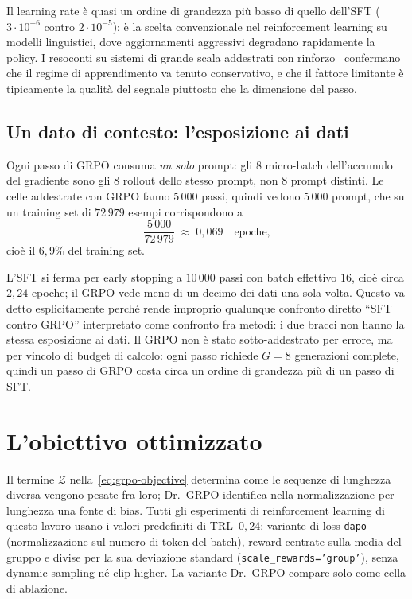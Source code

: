 Il learning rate è quasi un ordine di grandezza più basso di quello dell'SFT
($3\cdot 10^{-6}$ contro $2\cdot 10^{-5}$): è la scelta convenzionale nel
reinforcement learning su modelli linguistici, dove aggiornamenti aggressivi
degradano rapidamente la policy. I resoconti su sistemi di grande scala
addestrati con rinforzo~\cite{kimi2025k15} confermano che il regime di
apprendimento va tenuto conservativo, e che il fattore limitante è tipicamente
la qualità del segnale piuttosto che la dimensione del passo.

\subsection{Un dato di contesto: l'esposizione ai dati}

Ogni passo di GRPO consuma \emph{un solo} prompt: gli $8$ micro-batch
dell'accumulo del gradiente sono gli $8$ rollout dello stesso prompt, non $8$
prompt distinti. Le celle addestrate con GRPO fanno $5\,000$ passi, quindi vedono
$5\,000$ prompt, che su un training set di $72\,979$ esempi corrispondono a
\begin{equation}
  \frac{5\,000}{72\,979} \;\approx\; 0{,}069
  \quad\text{epoche,}
\end{equation}
cioè il $6{,}9\%$ del training set.

L'SFT si ferma per early stopping a $10\,000$ passi con batch effettivo $16$,
cioè circa $2{,}24$ epoche; il GRPO vede meno di un decimo dei dati una sola
volta. Questo va detto
esplicitamente perché rende improprio qualunque confronto diretto ``SFT contro
GRPO'' interpretato come confronto fra metodi: i due bracci non hanno la stessa
esposizione ai dati. Il GRPO non è stato sotto-addestrato per errore, ma per
vincolo di budget di calcolo: ogni passo richiede $G=8$ generazioni complete,
quindi un passo di GRPO costa circa un ordine di grandezza più di un passo di
SFT.

\section{L'obiettivo ottimizzato}
\label{sec:denominatori}

Il termine $\mathcal{Z}$ nella~\eqref{eq:grpo-objective} determina come le
sequenze di lunghezza diversa vengono pesate fra loro; Dr.~GRPO
\cite{liu2025drgrpo} identifica nella normalizzazione per lunghezza una fonte di
bias. Tutti gli esperimenti di reinforcement learning di questo lavoro usano i
valori predefiniti di TRL~$0{,}24$: variante di loss \texttt{dapo}
(normalizzazione sul numero di token del batch), reward centrate sulla media del
gruppo e divise per la sua deviazione standard (\texttt{scale\_rewards='group'}),
senza dynamic sampling né clip-higher. La variante Dr.~GRPO compare solo come cella di ablazione.

